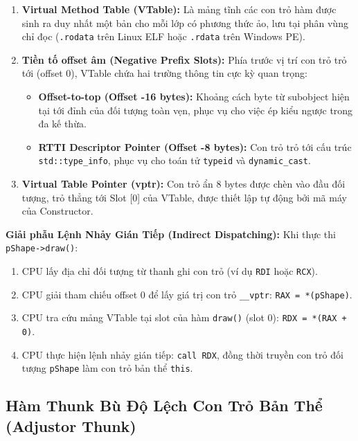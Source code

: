\documentclass[12pt,a4paper,oneside]{book}
\begin{document}
\begin{underhoodbox}
\begin{enumerate}
    \item \textbf{Virtual Method Table (VTable):} Là mảng tĩnh các con trỏ hàm được sinh ra duy nhất một bản cho mỗi lớp có phương thức ảo, lưu tại phân vùng chỉ đọc (\texttt{.rodata} trên Linux ELF hoặc \texttt{.rdata} trên Windows PE).
    \item \textbf{Tiền tố offset âm (Negative Prefix Slots):} Phía trước vị trí con trỏ trỏ tới (offset 0), VTable chứa hai trường thông tin cực kỳ quan trọng:
    \begin{itemize}
        \item \textbf{Offset-to-top (Offset -16 bytes):} Khoảng cách byte từ subobject hiện tại tới đỉnh của đối tượng toàn vẹn, phục vụ cho việc ép kiểu ngược trong đa kế thừa.
        \item \textbf{RTTI Descriptor Pointer (Offset -8 bytes):} Con trỏ trỏ tới cấu trúc \texttt{std::type\_info}, phục vụ cho toán tử \texttt{typeid} và \texttt{dynamic\_cast}.
    \end{itemize}
    \item \textbf{Virtual Table Pointer (vptr):} Con trỏ ẩn 8 bytes được chèn vào đầu đối tượng, trỏ thẳng tới Slot [0] của VTable, được thiết lập tự động bởi mã máy của Constructor.
\end{enumerate}

\textbf{Giải phẫu Lệnh Nhảy Gián Tiếp (Indirect Dispatching):}
Khi thực thi \texttt{pShape->draw()}:
\begin{enumerate}
    \item CPU lấy địa chỉ đối tượng từ thanh ghi con trỏ (ví dụ \texttt{RDI} hoặc \texttt{RCX}).
    \item CPU giải tham chiếu offset 0 để lấy giá trị con trỏ \texttt{\_\_vptr}: \texttt{RAX = *(pShape)}.
    \item CPU tra cứu mảng VTable tại slot của hàm \texttt{draw()} (slot 0): \texttt{RDX = *(RAX + 0)}.
    \item CPU thực hiện lệnh nhảy gián tiếp: \texttt{call RDX}, đồng thời truyền con trỏ đối tượng \texttt{pShape} làm con trỏ bản thể \texttt{this}.
\end{enumerate}
\end{underhoodbox}

\subsection{Hàm Thunk Bù Độ Lệch Con Trỏ Bản Thể (Adjustor Thunk)}
\end{document}

